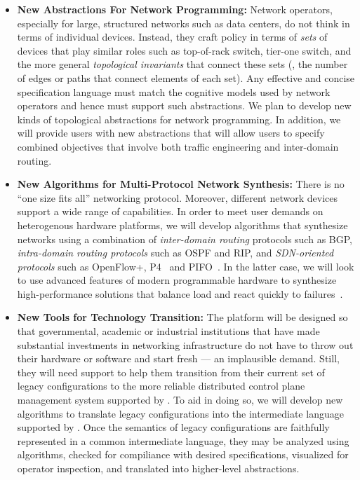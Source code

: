 \begin{itemize}
\item {\bf New Abstractions For Network Programming:}  Network operators, especially for large, structured networks such 
as data centers, do not think in terms of individual devices.  Instead, they craft policy in terms of \emph{sets} of devices that
play similar roles such as top-of-rack switch, tier-one switch, \etc and the more general \emph{topological invariants} that connect
these sets (\eg, the number of edges or paths that connect elements of each set).  Any effective and concise specification language 
must
match the cognitive models used by network operators and hence must support such abstractions.  We plan to develop new kinds of
topological abstractions for network programming.  In addition, we will provide users with 
new abstractions that will allow users to specify combined objectives that
involve both traffic engineering and inter-domain routing.

\item {\bf New Algorithms for Multi-Protocol Network Synthesis:}  There is no ``one size fits all'' networking protocol.  Moreover,
different network devices support a wide range of capabilities.  In order 
to meet user demands on heterogenous hardware platforms, we will develop algorithms that synthesize networks using
a combination of \emph{inter-domain routing} protocols such as BGP, \emph{intra-domain routing protocols} such as OSPF and RIP, and 
\emph{SDN-oriented
protocols} such as OpenFlow+\cite{openflow}, P4~\cite{P4} and PIFO~\cite{PIFO}.  In the latter case, we will look to use advanced features
of modern programmable hardware to synthesize high-performance
solutions that balance load and react quickly to failures~\cite{conga,hula}.

\item {\bf New Tools for Technology Transition:}  The \Propane platform will be designed so that governmental, academic or industrial institutions that
have made substantial investments in networking infrastructure do not have to throw out their hardware or software and start fresh --- an implausible 
demand.  Still, they will need support to help them transition from their current set of legacy configurations to the more reliable distributed
control plane management system supported by \Propane.  To aid in doing so, we will develop new algorithms to translate legacy configurations into 
the intermediate
language supported by \Propane.  Once the semantics of legacy configurations are faithfully represented in a common intermediate language, they may be 
analyzed using \Propane algorithms, checked for compiliance with desired specifications, visualized for operator inspection, and translated into
higher-level abstractions.


\end{itemize}
